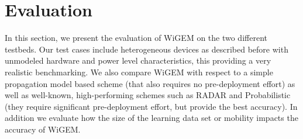 \section{Evaluation}
\label{sec:evaluation}

In this section, we present the evaluation of WiGEM on the two different testbeds. 
Our test cases include heterogeneous devices as described before with unmodeled hardware and power level characteristics, this providing a very realistic
benchmarking. We also compare WiGEM with respect 
to a simple propagation model based scheme (that also requires no pre-deployment effort) as well as well-known, high-performing schemes such as RADAR and Probabilistic~\cite{Haeberlen:2004:PRL:1023720.1023728,Youssef:2008:HLD:1399551.1399558,Roos} (they require significant pre-deployment effort, but provide the best accuracy). In addition we evaluate how the size
of the learning data set or mobility impacts the accuracy of WiGEM. 

%
%
%



